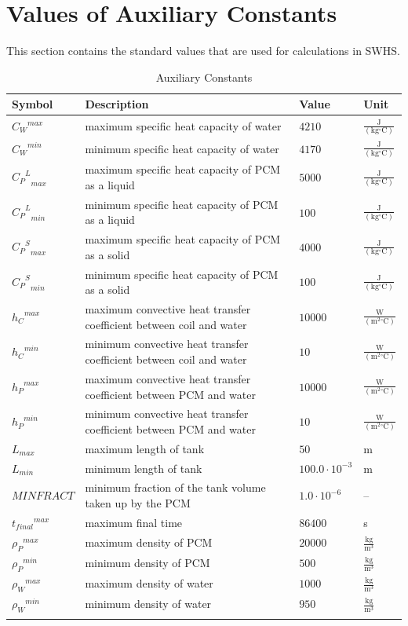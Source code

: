 \documentclass[12pt]{article}
\begin{document}
\section{Values of Auxiliary Constants}
\label{Sec:AuxConstants}
This section contains the standard values that are used for calculations in SWHS.
\begin{longtabu}{l X[l] l l}
\toprule
Symbol & Description & Value & Unit
\\
\midrule
\endhead
${{C_{W}}^{max}}$ & maximum specific heat capacity of water & $4210$ & $\frac{\text{J}}{(\text{kg}{}^{\circ}\text{C})}$
\\
${{C_{W}}^{min}}$ & minimum specific heat capacity of water & $4170$ & $\frac{\text{J}}{(\text{kg}{}^{\circ}\text{C})}$
\\
${{{C_{P}}^{L}}_{max}}$ & maximum specific heat capacity of PCM as a liquid & $5000$ & $\frac{\text{J}}{(\text{kg}{}^{\circ}\text{C})}$
\\
${{{C_{P}}^{L}}_{min}}$ & minimum specific heat capacity of PCM as a liquid & $100$ & $\frac{\text{J}}{(\text{kg}{}^{\circ}\text{C})}$
\\
${{{C_{P}}^{S}}_{max}}$ & maximum specific heat capacity of PCM as a solid & $4000$ & $\frac{\text{J}}{(\text{kg}{}^{\circ}\text{C})}$
\\
${{{C_{P}}^{S}}_{min}}$ & minimum specific heat capacity of PCM as a solid & $100$ & $\frac{\text{J}}{(\text{kg}{}^{\circ}\text{C})}$
\\
${{h_{C}}^{max}}$ & maximum convective heat transfer coefficient between coil and water & $10000$ & $\frac{\text{W}}{(\text{m}^{2}{}^{\circ}\text{C})}$
\\
${{h_{C}}^{min}}$ & minimum convective heat transfer coefficient between coil and water & $10$ & $\frac{\text{W}}{(\text{m}^{2}{}^{\circ}\text{C})}$
\\
${{h_{P}}^{max}}$ & maximum convective heat transfer coefficient between PCM and water & $10000$ & $\frac{\text{W}}{(\text{m}^{2}{}^{\circ}\text{C})}$
\\
${{h_{P}}^{min}}$ & minimum convective heat transfer coefficient between PCM and water & $10$ & $\frac{\text{W}}{(\text{m}^{2}{}^{\circ}\text{C})}$
\\
${L_{max}}$ & maximum length of tank & $50$ & m
\\
${L_{min}}$ & minimum length of tank & $100.0\cdot{}10^{-3}$ & m
\\
$MINFRACT$ & minimum fraction of the tank volume taken up by the PCM & $1.0\cdot{}10^{-6}$ & --
\\
${{t_{final}}^{max}}$ & maximum final time & $86400$ & s
\\
${{ρ_{P}}^{max}}$ & maximum density of PCM & $20000$ & $\frac{\text{kg}}{\text{m}^{3}}$
\\
${{ρ_{P}}^{min}}$ & minimum density of PCM & $500$ & $\frac{\text{kg}}{\text{m}^{3}}$
\\
${{ρ_{W}}^{max}}$ & maximum density of water & $1000$ & $\frac{\text{kg}}{\text{m}^{3}}$
\\
${{ρ_{W}}^{min}}$ & minimum density of water & $950$ & $\frac{\text{kg}}{\text{m}^{3}}$
\\
\bottomrule
\caption{Auxiliary Constants}
\label{Table:TAuxConsts}
\end{longtabu}
\end{document}
